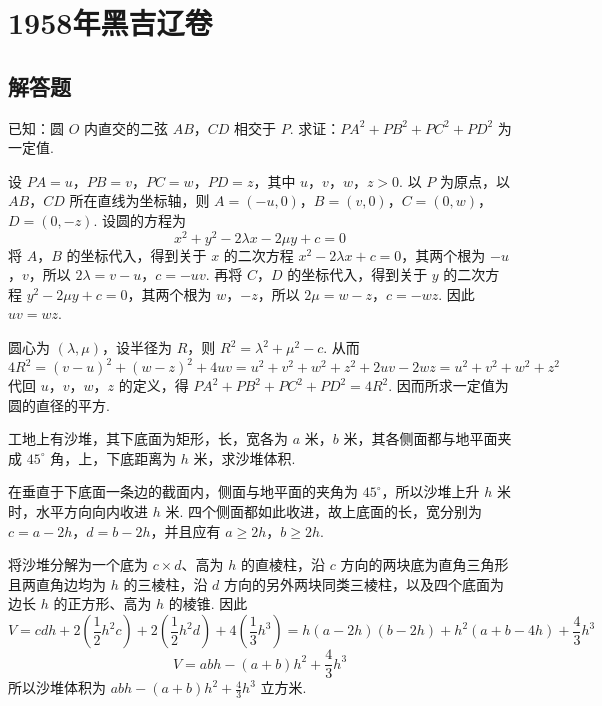 \chapter{1958年黑吉辽卷}

\section{解答题}

\begin{problem}
已知：圆 \(O\) 内直交的二弦 \(AB\)，\(CD\) 相交于 \(P\). 求证：\(PA^2+PB^2+PC^2+PD^2\) 为一定值.

\end{problem}

\begin{solution}
设 \(PA=u\)，\(PB=v\)，\(PC=w\)，\(PD=z\)，其中 \(u\)，\(v\)，\(w\)，\(z>0\). 以 \(P\) 为原点，以 \(AB\)，\(CD\) 所在直线为坐标轴，则
\(A=\left(-u,0\right)\)，\(B=\left(v,0\right)\)，\(C=\left(0,w\right)\)，\(D=\left(0,-z\right)\). 设圆的方程为
\[
x^2+y^2-2\lambda x-2\mu y+c=0
\]
将 \(A\)，\(B\) 的坐标代入，得到关于 \(x\) 的二次方程
\(x^2-2\lambda x+c=0\)，其两个根为 \(-u\)，\(v\)，所以
\(2\lambda=v-u\)，\(c=-uv\). 再将 \(C\)，\(D\) 的坐标代入，得到关于 \(y\) 的二次方程
\(y^2-2\mu y+c=0\)，其两个根为 \(w\)，\(-z\)，所以 \(2\mu=w-z\)，\(c=-wz\). 因此 \(uv=wz\).

圆心为 \(\left(\lambda,\mu\right)\)，设半径为 \(R\)，则 \(R^2=\lambda^2+\mu^2-c\). 从而
\[
4R^2=\left(v-u\right)^2+\left(w-z\right)^2+4uv=u^2+v^2+w^2+z^2+2uv-2wz=u^2+v^2+w^2+z^2
\]
代回 \(u\)，\(v\)，\(w\)，\(z\) 的定义，得
\(PA^2+PB^2+PC^2+PD^2=4R^2\). 因而所求一定值为圆的直径的平方.
\end{solution}

\begin{problem}
工地上有沙堆，其下底面为矩形，长，宽各为 \(a\text{ 米}\)，\(b\text{ 米}\)，其各侧面都与地平面夹成 \(45^\circ\) 角，上，下底距离为 \(h\text{ 米}\)，求沙堆体积.

\end{problem}

\begin{solution}
在垂直于下底面一条边的截面内，侧面与地平面的夹角为 \(45^\circ\)，所以沙堆上升 \(h\text{ 米}\) 时，水平方向向内收进 \(h\text{ 米}\). 四个侧面都如此收进，故上底面的长，宽分别为
\(c=a-2h\)，\(d=b-2h\)，并且应有 \(a\ge2h\)，\(b\ge2h\).

将沙堆分解为一个底为 \(c\times d\)、高为 \(h\) 的直棱柱，沿 \(c\) 方向的两块底为直角三角形且两直角边均为 \(h\) 的三棱柱，沿 \(d\) 方向的另外两块同类三棱柱，以及四个底面为边长 \(h\) 的正方形、高为 \(h\) 的棱锥. 因此
\[
V=cdh+2\left(\frac12h^2c\right)+2\left(\frac12h^2d\right)+4\left(\frac13h^3\right)=h\left(a-2h\right)\left(b-2h\right)+h^2\left(a+b-4h\right)+\frac43h^3
\]
\[
V=abh-(a+b)h^2+\frac43h^3
\]
所以沙堆体积为 \(abh-(a+b)h^2+\frac43h^3\text{ 立方米}\).
\end{solution}

